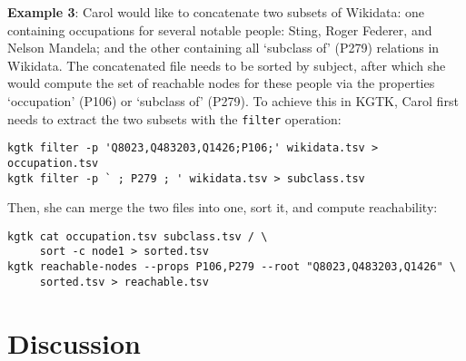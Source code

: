 \documentclass[runningheads]{llncs}
\newcommand{\kibitz}[2]{%
{\color{#1}#2}{}%
}
\newcommand{\DG}[1]{\kibitz{red}{[DG: #1]}} %
\begin{document}
\textbf{Example 3}: Carol would like to concatenate two subsets of Wikidata: one containing occupations for several notable people: Sting, Roger Federer, and Nelson Mandela; and the other containing all `subclass of' (P279) relations in Wikidata. The concatenated file needs to be sorted by subject, after which she would compute the set of reachable nodes for these people via the properties `occupation' (P106) or `subclass of' (P279). To achieve this in KGTK, Carol first needs to extract the two subsets with the \texttt{filter} operation:
{\footnotesize
\begin{verbatim}
kgtk filter -p 'Q8023,Q483203,Q1426;P106;' wikidata.tsv > occupation.tsv
kgtk filter -p ` ; P279 ; ' wikidata.tsv > subclass.tsv
\end{verbatim}
}

Then, she can merge the two files into one, sort it, and compute reachability:
{\footnotesize
\begin{verbatim}
kgtk cat occupation.tsv subclass.tsv / \
     sort -c node1 > sorted.tsv
kgtk reachable-nodes --props P106,P279 --root "Q8023,Q483203,Q1426" \
     sorted.tsv > reachable.tsv
\end{verbatim}
}



\section{Discussion}\label{sec:showcase}


\end{document}
